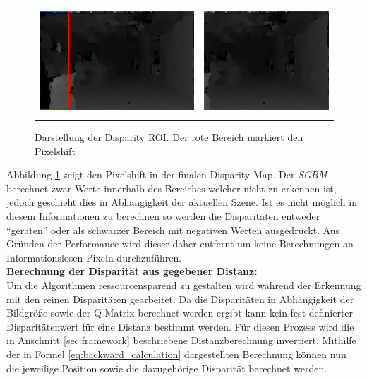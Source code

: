 	\begin{figure}[h]
		\centering
		\begin{tabular}{cc}
			\includegraphics[height=4cm]{img/evaluation/dmap_noroi} &
			\includegraphics[height=4cm]{img/evaluation/dmap_roi}
		\end{tabular}
		\caption{Darstellung der Disparity ROI. Der rote Bereich markiert den Pixelshift}
		\label{fig:dmap_roi}
	\end{figure}

	\noindent
	Abbildung \ref{fig:dmap_roi} zeigt den Pixelshift in der finalen Disparity Map. Der \emph{SGBM} berechnet zwar Werte innerhalb des Bereiches welcher nicht zu erkennen ist, jedoch geschieht dies in Abhängigkeit der aktuellen Szene. Ist es nicht möglich in diesem Informationen zu berechnen so werden die Disparitäten entweder \enquote{geraten} oder als schwarzer Bereich mit negativen Werten ausgedrückt. Aus Gründen der Performance wird dieser daher entfernt um keine Berechnungen an Informationslosen Pixeln durchzuführen.\\
	
\noindent
\textbf{Berechnung der Disparität aus gegebener Distanz:}\\
Um die Algorithmen ressourcensparend zu gestalten wird während der Erkennung mit den reinen Disparitäten gearbeitet. Da die Disparitäten in Abhängigkeit der Bildgröße sowie der Q-Matrix berechnet werden ergibt kann kein fest definierter Disparitätenwert für eine Distanz bestimmt werden. Für diesen Prozess wird die in Anschnitt \ref{sec:framework} beschriebene Distanzberechnung invertiert. Mithilfe der in Formel \ref{eq:backward_calculation} dargestellten Berechnung können nun die jeweilige Position sowie die dazugehörige Disparität berechnet werden. 

